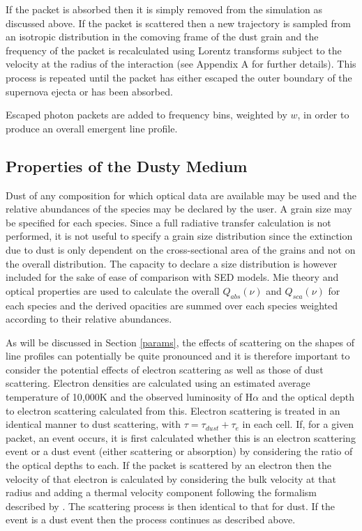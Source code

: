 \documentclass[useAMS,usenatbib,usegraphicx]{mnras}
\begin{document}
If the packet is absorbed then it is simply removed from the simulation as 
discussed above.  If the packet is scattered then a new trajectory is 
sampled from an isotropic distribution in the comoving frame of the dust 
grain and the frequency of the packet is recalculated using Lorentz 
transforms subject to the velocity at the radius of the interaction (see 
Appendix A for further details).  This process is repeated until the 
packet has either escaped the outer boundary of the supernova ejecta or has been 
absorbed.
   
Escaped photon packets are added to frequency bins, weighted by $w$, in order to 
produce an overall emergent line profile.


\subsection{Properties of the Dusty Medium}

Dust of any composition for which optical data are available may be used
and the relative abundances of the species may be declared by the user.  
A grain size may be specified for each species.  Since a full radiative 
transfer calculation is not performed, it is not useful to specify a grain 
size distribution since the extinction due to dust is only dependent on the 
cross-sectional area of the grains and not on the overall distribution.  
The capacity to declare a size distribution is however included for the 
sake of ease of comparison with SED models.  Mie theory and optical properties are used 
to calculate the overall $Q_{abs}(\nu)$ and $Q_{sca}(\nu)$ for each 
species and the derived opacities are summed over each species weighted 
according to their relative abundances.


As will be discussed in Section \ref{params}, the effects of scattering 
on the shapes of line profiles can potentially be quite pronounced and it 
is therefore important to consider the potential effects of electron 
scattering as well as those of dust scattering.  Electron densities are 
calculated using an estimated average temperature of 10,000K and the observed luminosity 
of H${\alpha}$ and the optical depth to electron scattering calculated from this.  
Electron scattering is treated in an identical manner to dust scattering, 
with $\tau = \tau_{dust}+\tau_{e}$ in each cell.  If, for a given 
packet, an event occurs, it is first calculated whether this is an electron scattering event or a dust 
event (either scattering or absorption) by considering the ratio of the optical depths to each.  If the packet is scattered by an electron then the velocity of that electron is calculated by considering the bulk velocity at that radius and adding a thermal velocity component following the formalism described by \citet{Hillier1991}.  The scattering 
process is then identical to that for dust.  If the event is a dust event then the process continues as described above.
\end{document}
